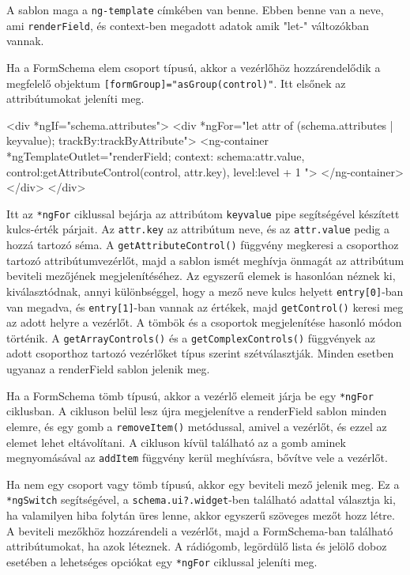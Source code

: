 A sablon maga a \texttt{ng-template} címkében van benne. Ebben benne van a neve, ami \texttt{renderField}, és context-ben megadott adatok amik "let-" változókban vannak.

Ha a FormSchema elem csoport típusú, akkor a vezérlőhöz hozzárendelődik a megfelelő objektum \texttt{[formGroup]="asGroup(control)"}. Itt elsőnek  az attribútumokat jeleníti meg.

\begin{java}
<div *ngIf="schema.attributes">
  <div *ngFor="let attr of (schema.attributes | keyvalue);
    trackBy:trackByAttribute">
      <ng-container *ngTemplateOutlet="renderField;
        context: {
          schema:attr.value,
          control:getAttributeControl(control, attr.key),
          level:level + 1
        }">
    </ng-container>
  </div>
</div>
\end{java}
Itt az \texttt{*ngFor} ciklussal bejárja az attribútom \texttt{keyvalue} pipe segítségével készített kulcs-érték párjait. Az \texttt{attr.key} az attribútum neve, és az \texttt{attr.value} pedig a hozzá tartozó séma. A \texttt{getAttributeControl()} függvény megkeresi a csoporthoz tartozó attribútumvezérlőt, majd a sablon ismét meghívja önmagát az attribútum beviteli mezőjének megjelenítéséhez.
Az egyszerű elemek is hasonlóan néznek ki, kiválasztódnak, annyi különbséggel, hogy a mező neve kulcs helyett \texttt{entry[0]}-ban van megadva, és \texttt{entry[1]}-ban vannak az értékek, majd \texttt{getControl()} keresi meg az adott helyre a vezérlőt. A tömbök és a csoportok megjelenítése hasonló módon történik. A \texttt{getArrayControls()} és a \texttt{getComplexControls()} függvények az adott csoporthoz tartozó vezérlőket típus szerint szétválasztják. Minden esetben ugyanaz a renderField sablon jelenik meg.


Ha a FormSchema tömb típusú, akkor a vezérlő elemeit járja be egy \texttt{*ngFor} ciklusban. A cikluson belül lesz újra megjelenítve a renderField sablon minden elemre, és egy gomb a \texttt{removeItem()} metódussal, amivel a vezérlőt, és ezzel az elemet lehet eltávolítani. A cikluson kívül található az a gomb aminek megnyomásával az \texttt{addItem} függvény kerül meghívásra, bővítve vele a vezérlőt.


Ha nem egy csoport vagy tömb típusú, akkor egy beviteli mező jelenik meg. Ez a \texttt{*ngSwitch} segítségével, a \texttt{schema.ui?.widget}-ben található adattal választja ki, ha valamilyen hiba folytán üres lenne, akkor egyszerű szöveges mezőt hozz létre. A beviteli mezőkhöz hozzárendeli a vezérlőt, majd a FormSchema-ban található attribútumokat, ha azok léteznek. A rádiógomb, legördülő lista és jelölő doboz esetében a lehetséges opciókat egy \texttt{*ngFor} ciklussal jeleníti meg.

